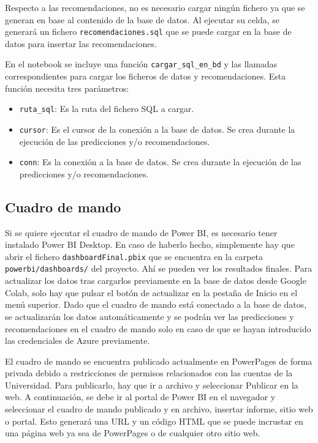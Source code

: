 Respecto a las recomendaciones, no es necesario cargar ningún fichero ya que se generan en base al contenido de la base de datos. 
Al ejecutar su celda, se generará un fichero \texttt{recomendaciones.sql} que se puede cargar en la base de datos para insertar las recomendaciones.

En el notebook se incluye una función \texttt{cargar\_sql\_en\_bd} y las llamadas correspondientes para cargar los ficheros de datos y recomendaciones.
Esta función necesita tres parámetros:
\begin{itemize}
    \item \texttt{ruta\_sql}: Es la ruta del fichero SQL a cargar.
    \item \texttt{cursor}: Es el cursor de la conexión a la base de datos. Se crea durante la ejecución de las predicciones y/o recomendaciones.
    \item \texttt{conn}: Es la conexión a la base de datos. Se crea durante la ejecución de las predicciones y/o recomendaciones.
\end{itemize}   

\subsection{Cuadro de mando}

Si se quiere ejecutar el cuadro de mando de Power BI, es necesario tener instalado Power BI Desktop.
En caso de haberlo hecho, simplemente hay que abrir el fichero \texttt{dashboardFinal.pbix} que se encuentra en la carpeta \texttt{powerbi/dashboards/} del proyecto.
Ahí se pueden ver los resultados finales. Para actualizar los datos tras cargarlos previamente en la base de datos desde Google Colab, solo hay que pulsar el botón de actualizar en la pestaña de Inicio en el menú superior.
Dado que el cuadro de mando está conectado a la base de datos, se actualizarán los datos automáticamente y se podrán ver las predicciones y recomendaciones en el cuadro de mando solo en caso de que se hayan introducido las credenciales de Azure previamente.


El cuadro de mando se encuentra publicado actualmente en PowerPages de forma privada debido a restricciones de permisos relacionados con las cuentas de la Universidad.
Para publicarlo, hay que ir a archivo y seleccionar Publicar en la web. 
A continuación, se debe ir al portal de Power BI en el navegador y seleccionar el cuadro de mando publicado y en archivo, insertar informe, sitio web o portal.
Esto generará una URL y un código HTML que se puede incrustar en una página web ya sea de PowerPages o de cualquier otro sitio web. 

